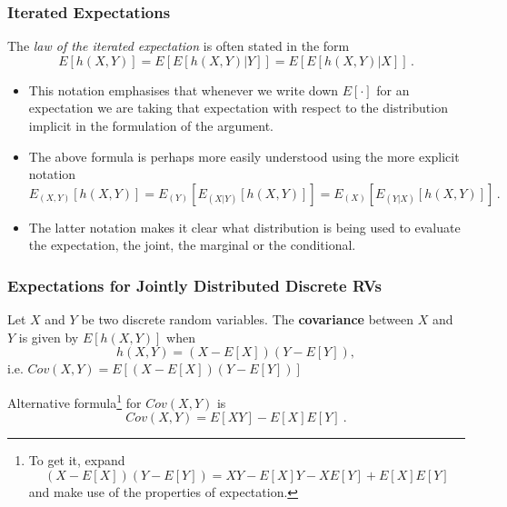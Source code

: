 \documentclass[notes=show,handout]{beamer}
\newenvironment{stepitemize}{\begin{itemize}[<+->]}{\end{itemize} }
\begin{document}
\begin{frame}%

\frametitle{Iterated Expectations}

\begin{definition}
The \textit{law of the iterated expectation} is often stated in the
form 
\begin{equation*}
E[h(X,Y)]=E[E[h(X,Y)|Y]]=E[E[h(X,Y)|X]]\,. 
\end{equation*}
\end{definition}

\begin{stepitemize}

\item This notation emphasises that whenever we write down $E[\cdot]$ for an
expectation we are taking that expectation with respect to the distribution
implicit in the formulation of the argument. 

\item The above formula is perhaps more easily understood using the more
explicit notation  
\begin{equation*}
E_{(X,Y)}[h(X,Y)]=E_{(Y)}[E_{(X|Y)}[h(X,Y)]]=E_{(X)}[E_{(Y|X)}[h(X,Y)]]\,. 
\end{equation*}

\item The latter notation makes it clear what distribution is being used to
evaluate the expectation, the joint, the marginal or the conditional.
\end{stepitemize}

\end{frame}%




\begin{frame}
\frametitle{Expectations for Jointly Distributed Discrete RVs}

\begin{definition}
Let $X$ and $Y$ be two discrete random variables. 
The \textbf{covariance} between $X$ and\textbf{\ }$Y$ is given by $%
E\left[ h\left(X,Y\right) \right] $ when%
\begin{equation*}
h\left(X,Y\right) =%
\left(X-E\left[ X\right] \right) \left( Y-E\left[ Y\right] \right),%
\end{equation*}
i.e. $Cov\left(X,Y\right) =E\left[ \left(X-E\left[ X\right] \right)
\left(Y-E\left[ Y\right] \right) \right] $
\end{definition}

Alternative formula\footnote{To get it, expand 
$$\left(X-E\left[ X\right] \right) \left( Y-E\left[ Y\right] \right)=XY-E\left[ X\right]Y -XE\left[ Y\right] +E\left[ X\right]E\left[ Y\right]$$ and make use of the properties of expectation.} for $Cov(X,Y)$ is%
\begin{equation}
\boxed{Cov\left( X,Y\right) =E\left[ XY\right] -E\left[ X\right] E\left[ Y\right]\ .} \label{Cov}
\end{equation}

\end{frame}
\end{document}
